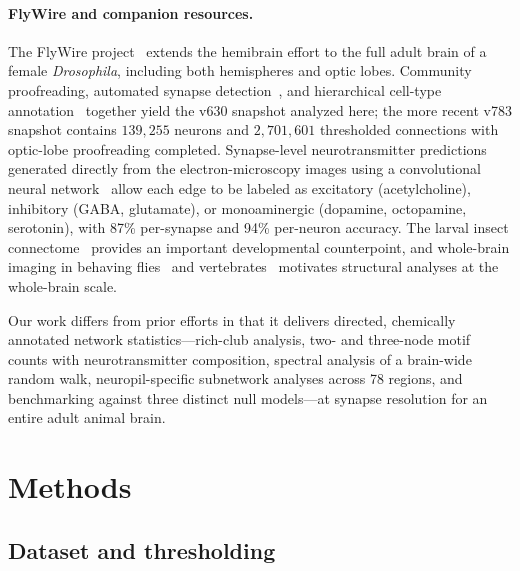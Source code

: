 \documentclass[11pt]{article}
\begin{document}
\paragraph{FlyWire and companion resources.}
The FlyWire project~\cite{dorkenwald2024flywire} extends the hemibrain
effort to the full adult brain of a female \textit{Drosophila}, including
both hemispheres and optic lobes. Community proofreading, automated
synapse detection~\cite{turner2021automated}, and hierarchical cell-type
annotation~\cite{schlegel2024whole} together yield the v630 snapshot
analyzed here; the more recent v783 snapshot contains $139{,}255$ neurons
and $2{,}701{,}601$ thresholded connections with optic-lobe proofreading
completed. Synapse-level neurotransmitter predictions generated directly
from the electron-microscopy images using a convolutional neural
network~\cite{eckstein2024neurotransmitter} allow each edge to be labeled
as excitatory (acetylcholine), inhibitory (GABA, glutamate), or
monoaminergic (dopamine, octopamine, serotonin), with 87\% per-synapse and
94\% per-neuron accuracy. The larval insect connectome~\cite{winding2023connectome}
provides an important developmental counterpoint, and whole-brain imaging
in behaving flies~\cite{mann2021coupling} and vertebrates~\cite{ahrens2013whole}
motivates structural analyses at the whole-brain scale.

Our work differs from prior efforts in that it delivers directed,
chemically annotated network statistics---rich-club analysis, two- and
three-node motif counts with neurotransmitter composition, spectral
analysis of a brain-wide random walk, neuropil-specific subnetwork
analyses across 78 regions, and benchmarking against three distinct null
models---at synapse resolution for an entire adult animal brain.

\section{Methods}

\subsection{Dataset and thresholding}
\end{document}
